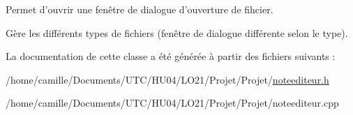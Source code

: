 Permet d'ouvrir une fenêtre de dialogue d'ouverture de fihcier. 

Gère les différents types de fichiers (fenêtre de dialogue différente selon le type). 

La documentation de cette classe a été générée à partir des fichiers suivants \-:\begin{DoxyCompactItemize}
\item 
/home/camille/\-Documents/\-U\-T\-C/\-H\-U04/\-L\-O21/\-Projet/\-Projet/\hyperlink{noteediteur_8h}{noteediteur.\-h}\item 
/home/camille/\-Documents/\-U\-T\-C/\-H\-U04/\-L\-O21/\-Projet/\-Projet/noteediteur.\-cpp\end{DoxyCompactItemize}
